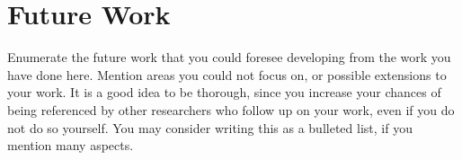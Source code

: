 \section{Future Work}

Enumerate the future work that you could foresee developing from the work you have done here. Mention areas you could not focus on, or possible extensions to your work. It is a good idea to be thorough, since you increase your chances of being referenced by other researchers who follow up on your work, even if you do not do so yourself. You may consider writing this as a bulleted list, if you mention many aspects.

